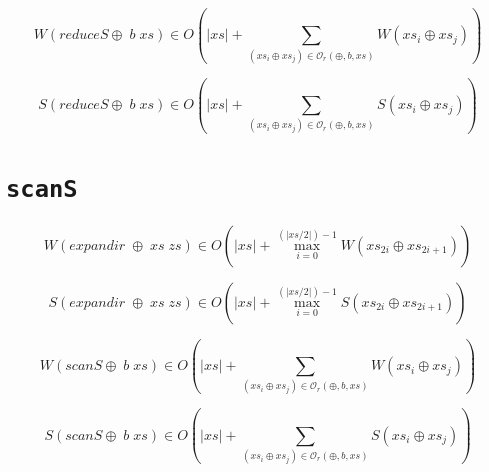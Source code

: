 \documentclass[a4paper,10pt]{article}
\begin{document}
\smallskip

\begin{equation*}
    W \left( reduceS \oplus \; b \; xs \right) \in
    O \left( \vert xs \vert + \sum_{(xs_i \oplus xs_j) \in \mathcal{O}_r(\oplus,b,xs)} W \left( xs_i \oplus xs_j \right) \right)
\end{equation*}

\bigskip

\begin{equation*}
    S \left( reduceS \oplus \; b \; xs \right) \in
    O \left( \vert xs \vert + \sum_{(xs_i \oplus xs_j) \in \mathcal{O}_r(\oplus,b,xs)} S \left( xs_i \oplus xs_j \right) \right)
\end{equation*}


\bigskip


\section*{\texttt{scanS}}


\begin{equation*}
    W \left( expandir \;\oplus \;xs \;zs \right) \in
    O \left( \vert xs \vert + \max_{i=0}^{(\vert xs / 2 \vert) - 1} W \left( xs_{2i} \oplus xs_{2i+1} \right) \right)
\end{equation*}

\begin{equation*}
    S \left( expandir \;\oplus \;xs \;zs \right) \in
    O \left( \vert xs \vert + \max_{i=0}^{(\vert xs / 2 \vert) - 1} S \left( xs_{2i} \oplus xs_{2i+1} \right) \right)
\end{equation*}

\bigskip

\begin{equation*}
    W \left( scanS \oplus \; b \; xs \right) \in
    O \left( \vert xs \vert + \sum_{(xs_i \oplus xs_j) \in \mathcal{O}_r(\oplus,b,xs)} W \left( xs_i \oplus xs_j \right) \right)
\end{equation*}

\begin{equation*}
    S \left( scanS \oplus \; b \; xs \right) \in
    O \left( \vert xs \vert + \sum_{(xs_i \oplus xs_j) \in \mathcal{O}_r(\oplus,b,xs)} S \left( xs_i \oplus xs_j \right) \right)
\end{equation*}




\end{document}
